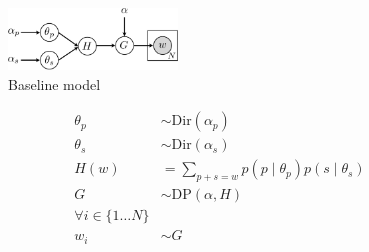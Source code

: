 \begin{figure}[h]
\centering
\includegraphics[width=0.4\textwidth]{fig/v1}
\caption{Baseline model}
\label{fig:v1}
\end{figure}

\begin{align*}
\theta_p & \sim \text{Dir}(\alpha_p) \\
\theta_s & \sim \text{Dir}(\alpha_s) \\
H(w) & = \sum_{p+s=w} p(p \mid \theta_p) p(s \mid \theta_s) \\
G & \sim \text{DP}(\alpha, H) \\
\forall i \in \{1 \dots N\} \\
w_i & \sim G
\end{align*}
